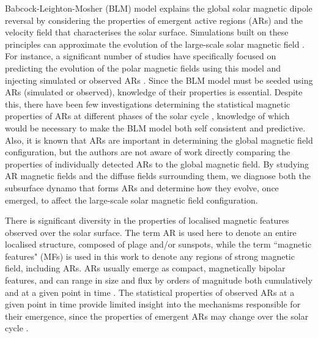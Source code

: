 \documentclass[namedreferences]{solarphysics}
\begin{document}
\begin{article}
Babcock-Leighton-Mosher (BLM) model \citep{Babcock:1961,Leighton:1964,Mosher:1977} explains the global solar magnetic dipole reversal by considering the properties of emergent active regions (ARs) and the velocity field that characterises the solar surface. Simulations built on these principles can approximate the evolution of the large-scale solar magnetic field \citep{Leighton:1964,Sheeley:1985,Devore:1986,Wang:1989}. For instance, a significant number of studies have specifically focused on predicting the evolution of the polar magnetic fields using this model and injecting simulated or observed ARs \citep{Devore:1987,schussler:2006,Wang:2009,Schrijver:2008b,Upton:2013}. Since the BLM model must be seeded using ARs (simulated or observed), knowledge of their properties is essential. Despite this, there have been few investigations determining the statistical magnetic properties of ARs at different phases of the solar cycle \citep{meunier:2003,zharkov:2006}, knowledge of which would be necessary to make the BLM model both self consistent and predictive. Also, it is known that ARs are important in determining the global magnetic field configuration\citep{wang:2003a, Schrijver:2003, schussler:2006}, but the authors are not aware of work directly comparing the properties of individually detected ARs to the global magnetic field. By studying AR magnetic fields and the diffuse fields surrounding them, we diagnose both the subsurface dynamo that forms ARs and determine how they evolve, once emerged, to affect the large-scale solar magnetic field configuration. 

There is significant diversity in the properties of localised magnetic features observed over the solar surface. The term AR is used here to denote an entire localised structure, composed of plage and/or sunspots, while the term ``magnetic features" (MFs) is used in this work to denote any regions of strong magnetic field, including ARs. ARs usually emerge as compact, magnetically bipolar features, and can range in size and flux by orders of magnitude both cumulatively \citep{meunier:2003} and at a given point in time   \citep{Parnell:2009}. The statistical properties of observed ARs at a given point in time provide limited insight into the mechanisms responsible for their emergence, since the properties of emergent ARs may change over the solar cycle \citep{meunier:2003,Lefevre:2011}.


\end{article}
\end{document}
